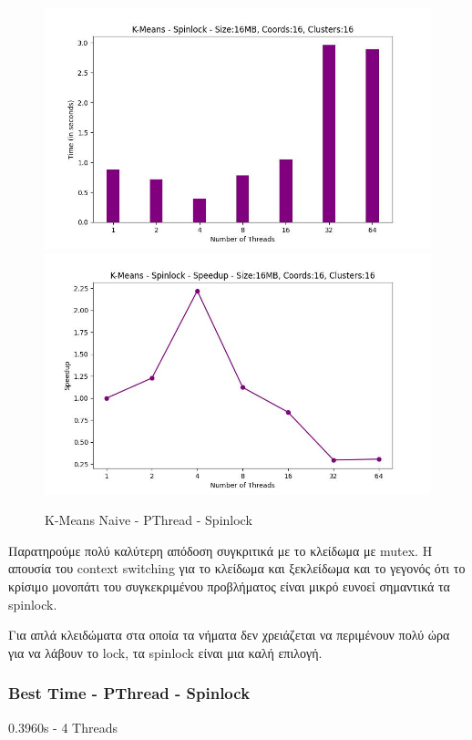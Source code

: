 \documentclass[../final_report.tex]{subfiles}
\begin{document}
\begin{figure}[H]
    \centering
        \includegraphics[scale=0.4]{outFilesAffinityMouliko/plots/kmeans_locks_pthread_spin.jpg}
        \includegraphics[scale=0.4]{outFilesAffinityMouliko/plots/kmeans_locks_pthread_spin_speedup.jpg}
    \caption{K-Means Naive - PThread - Spinlock}
    \label{fig:K-Means Naive - PThread - Spinlock}
\end{figure}

Παρατηρούμε πολύ καλύτερη απόδοση συγκριτικά με το κλείδωμα με mutex. Η απουσία του context switching για το κλείδωμα και ξεκλείδωμα και 
το γεγονός ότι το κρίσιμο μονοπάτι του συγκεκριμένου προβλήματος είναι μικρό ευνοεί σημαντικά τα spinlock.

Για απλά κλειδώματα στα οποία τα νήματα δεν χρειάζεται να περιμένουν πολύ ώρα για να λάβουν το lock, τα spinlock
είναι μια καλή επιλογή.

\subsubsection*{Best Time - PThread - Spinlock}
0.3960s - 4 Threads
\end{document}
